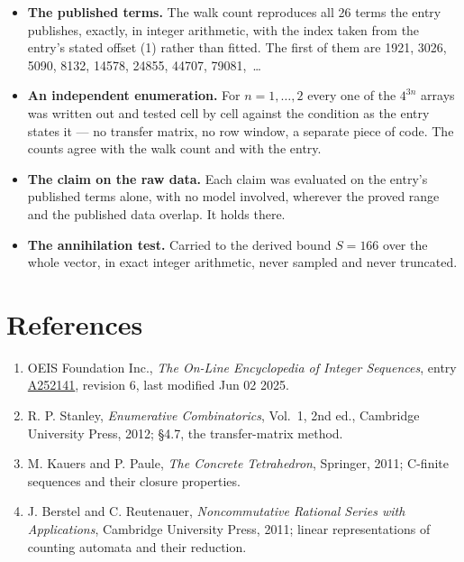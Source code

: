 \documentclass[11pt]{article}
\theoremstyle{definition}
\begin{document}
\begin{itemize}

\item {\bfseries The published terms.} The walk count reproduces all 26 terms the entry publishes, exactly, in integer arithmetic, with the index taken from the entry's stated offset (1) rather than fitted. The first of them are 1921, 3026, 5090, 8132, 14578, 24855, 44707, 79081,~\dots

\item {\bfseries An independent enumeration.} For $n = 1,\dots,2$ every one of the $4^{3n}$ arrays was written out and tested cell by cell against the condition as the entry states it --- no transfer matrix, no row window, a separate piece of code. The counts agree with the walk count and with the entry.

\item {\bfseries The claim on the raw data.} Each claim was evaluated on the entry's published terms alone, with no model involved, wherever the proved range and the published data overlap. It holds there.

\item {\bfseries The annihilation test.} Carried to the derived bound $S = 166$ over the whole vector, in exact integer arithmetic, never sampled and never truncated.

\end{itemize}

\section{References}

\begin{enumerate}

\item OEIS Foundation Inc., \emph{The On-Line Encyclopedia of Integer Sequences}, entry \href{https://oeis.org/A252141}{A252141}, revision 6, last modified Jun 02 2025.

\item R. P. Stanley, \emph{Enumerative Combinatorics}, Vol.~1, 2nd ed., Cambridge University Press, 2012; \S4.7, the transfer-matrix method.

\item M. Kauers and P. Paule, \emph{The Concrete Tetrahedron}, Springer, 2011; C-finite sequences and their closure properties.

\item J. Berstel and C. Reutenauer, \emph{Noncommutative Rational Series with Applications}, Cambridge University Press, 2011; linear representations of counting automata and their reduction.

\end{enumerate}
\end{document}
